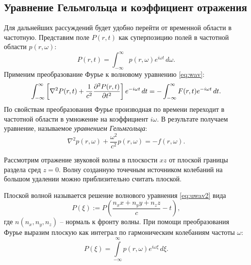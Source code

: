 \documentclass[a4paper, fontsize=14pt]{article}
\begin{document}
	\subsection{Уравнение Гельмгольца и коэффициент отражения}
	Для дальнейших рассуждений будет удобно перейти от временной области в частотную. Представим поле $P(r,t)$ как суперпозицию полей в частотной области $p(r,\omega)$:
	\begin{equation}
		P(r,t) =  \int_{-\infty}^{\infty} p(r,\omega) e^{i\omega t}\, d\omega.
	\end{equation}
	Применим преобразование Фурье к волновому уравнению \eqref{eq:wav}:
	\begin{equation}
		\int_{-\infty}^{\infty} \left[ \nabla^2 P(r,t) + \frac{1}{c^2}\diff[2]{P(r,t)}{t}\right] e^{-i\omega t} \, dt = - \int_{-\infty}^{\infty}   F(r,t) e^{-i\omega t} \, dt.
	\end{equation}
	По свойствам преобразования Фурье производная по времени переходит в частотной области в умножение на коэффициент 
	$i\omega$. В результате получаем уравнение, называемое {\it уравнением Гельмгольца}:
	\begin{equation}
		\nabla^2 p(r,\omega) + \frac{\omega^2}{c^2}p(r,\omega) = - f(r,\omega).
		\label{eq:helmholtz}
	\end{equation}

	Рассмотрим отражение звуковой волны в плоскости $xz$ от плоской границы раздела сред $z=0$. Волну созданную точечным источником колебаний на большом удалении можно приблизительно считать плоской. 

	Плоской волной называется решение волнового уравнения \eqref{eq:uwav2} вида $$P(\xi) := P\left(\frac{n_xx+n_yy+n_zz}{c}-t\right),$$ где $n(n_x,n_y,n_z)$ -- нормаль к фронту волны.
	При помощи преобразования Фурье выразим плоскую как интеграл по гармоническим колебаниям частоты $\omega$:
	\begin{equation}
		P(\xi) = \int \limits_{-\infty}^{\infty} p(r,\omega) e^{i\omega \xi}\, d\xi.
	\end{equation}
\end{document}
